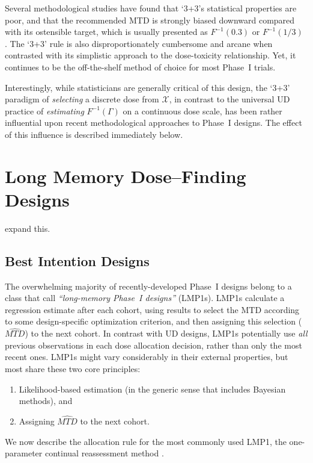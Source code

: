 Several methodological studies have found that `3+3's statistical properties are poor, and that the recommended MTD is strongly biased downward compared with its ostensible target, which is usually presented as $F^{-1}(0.3)$ or $F^{-1}(1/3)$ \citep{Rein:Paol:O'Qu:oper:1999,Lin:Shih:stat:2001}. The `3+3' rule is also disproportionately cumbersome and arcane when contrasted with its simplistic approach to the dose-toxicity relationship. Yet, it continues to be the off-the-shelf method of choice for most Phase~I trials.

Interestingly, while statisticians are generally critical of this design, the `3+3' paradigm of \emph{selecting} a discrete dose from $\mathcal{X}$, in contrast to the universal UD practice of \emph{estimating} $F^{-1}(\Gamma)$ on a continuous dose scale, has been rather influential upon recent methodological approaches to Phase~I designs. The effect of this influence is described immediately below.

\section{Long Memory Dose--Finding Designs}
expand this.
\subsection{Best Intention Designs}
The overwhelming majority of recently-developed Phase~I designs belong to a class that \cite{Oron:Hoff:smal:2013} call \emph{``long-memory Phase~I designs''} (LMP1s). LMP1s calculate a regression estimate after each cohort, using results to select the MTD according to some design-specific optimization criterion, and then assigning this selection ($\widehat{MTD}$) to the next cohort. In contrast with UD designs, LMP1s potentially use \emph{all} previous observations in each dose allocation decision, rather than only the most recent ones. LMP1s might vary considerably in their external properties, but most share these two core principles:
\begin{enumerate}
\item Likelihood-based estimation (in the generic sense that includes Bayesian methods), and
\item Assigning  $\widehat{MTD}$ to the next cohort.
\end{enumerate}
We now describe the allocation rule for the most commonly used LMP1, the one-parameter continual reassessment method  \citep{O'Qu:Pepe:Fish:cont:1990}.

